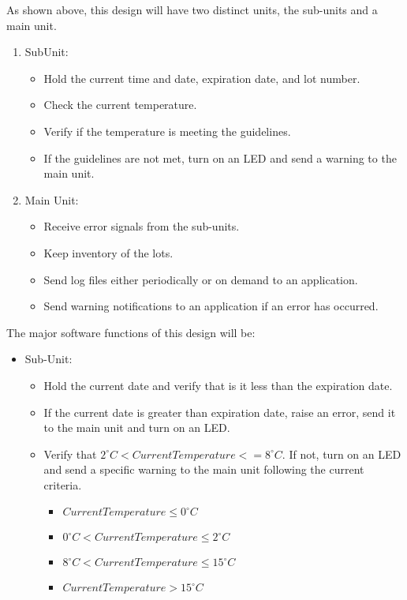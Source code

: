 \newpage
As shown above, this design will have two distinct units, the sub-units and a main unit.\\
\begin{enumerate}
  \item Sub\-Unit:
        \begin{itemize}
          \item Hold the current time and date, expiration date, and lot number.
          \item Check the current temperature.
          \item Verify if the temperature is meeting the guidelines.
          \item If the guidelines are not met, turn on an LED and send a warning
                to the main unit.
        \end{itemize}
  \item Main Unit:
        \begin{itemize}
          \item Receive error signals from the sub-units.
          \item Keep inventory of the lots.
          \item Send log files either periodically or on demand to an
                application.
          \item Send warning notifications to an application if an error has
                occurred.
        \end{itemize}
\end{enumerate}
The major software functions of this design will be:
\begin{itemize}
  \item Sub-Unit:
        \begin{itemize}
          \item Hold the current date and verify that is it less than the
                expiration date.
          \item If the current date is greater than expiration date, raise an
                error, send it to the main unit and turn on an LED.
          \item Verify that
                \textnormal{$2^{\circ}C < Current Temperature <= 8^{\circ}C$}.
                If not, turn on an LED and send a specific warning to the main
                unit following the current criteria.
                \begin{itemize}
                  \item \textnormal{$Current Temperature \leq 0^{\circ}C$}
                  \item
                        \textnormal{$0^{\circ}C < Current Temperature \leq 2^{\circ}C$}
                  \item
                        \textnormal{$8^{\circ}C < Current Temperature \leq 15^{\circ}C$}
                  \item \textnormal{$Current Temperature > 15^{\circ}C$}
                \end{itemize}
        \end{itemize}
\end{itemize}
